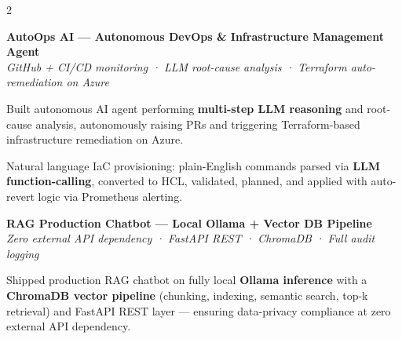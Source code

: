 \documentclass[10pt, a4paper]{article}
\newcommand{\projentry}[3]{%
  \vspace{1pt}%
  {\fontsize{9pt}{9pt}\selectfont\textbf{\textcolor{mainDark}{#1}}}\\[-1pt]%
  {\fontsize{7.5pt}{7.5pt}\selectfont\textit{\textcolor{companyCol}{#2}}}%
  \vspace{2pt}%
  #3
  \vspace{7pt}%
}
\begin{document}
\begin{paracol}{2}
\begin{minipage}{\linewidth-14pt}
\projentry%
  {AutoOps AI — Autonomous DevOps \& Infrastructure Management Agent}%
  {GitHub + CI/CD monitoring · LLM root-cause analysis · Terraform auto-remediation on Azure}%
  {%
    \begin{cvbullets}
      \item[\textcolor{bulletCol}{\scriptsize$\blacktriangleright$}]
        Built autonomous AI agent performing \textbf{multi-step LLM reasoning} and root-cause
        analysis, autonomously raising PRs and triggering Terraform-based infrastructure
        remediation on Azure.
      \item[\textcolor{bulletCol}{\scriptsize$\blacktriangleright$}]
        Natural language IaC provisioning: plain-English commands parsed via
        \textbf{LLM function-calling}, converted to HCL, validated, planned, and applied
        with auto-revert logic via Prometheus alerting.
    \end{cvbullets}%
  }

\projentry%
  {RAG Production Chatbot — Local Ollama + Vector DB Pipeline}%
  {Zero external API dependency · FastAPI REST · ChromaDB · Full audit logging}%
  {%
    \begin{cvbullets}
      \item[\textcolor{bulletCol}{\scriptsize$\blacktriangleright$}]
        Shipped production RAG chatbot on fully local \textbf{Ollama inference} with a
        \textbf{ChromaDB vector pipeline} (chunking, indexing, semantic search, top-k
        retrieval) and FastAPI REST layer — ensuring data-privacy compliance at zero
        external API dependency.
    \end{cvbullets}%
  }

\end{minipage}

\end{paracol}
\end{document}
